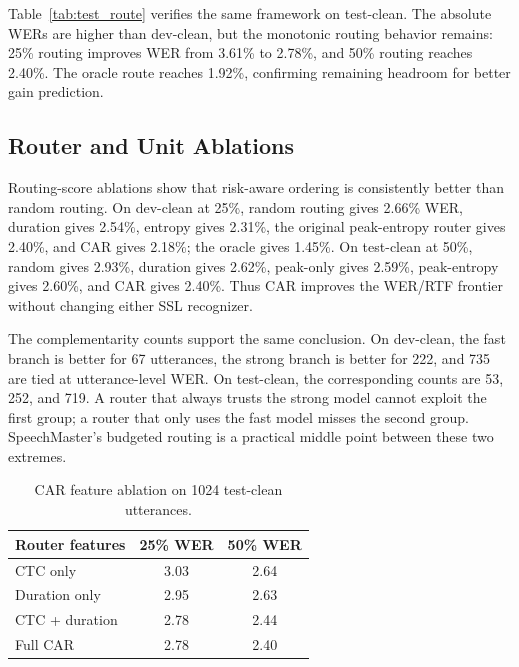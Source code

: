 \documentclass{article}
\begin{document}
Table~\ref{tab:test_route} verifies the same framework on test-clean. The
absolute WERs are higher than dev-clean, but the monotonic routing behavior
remains: 25\% routing improves WER from 3.61\% to 2.78\%, and 50\% routing
reaches 2.40\%. The oracle route reaches 1.92\%, confirming remaining headroom
for better gain prediction.

\begin{table}[t]
\centering
\caption{SpeechMaster-CAR routing on 1024 LibriSpeech test-clean utterances.}
\label{tab:test_route}
\small
{}
\end{table}

\subsection{Router and Unit Ablations}

Routing-score ablations show that risk-aware ordering is consistently better
than random routing. On dev-clean at 25\%, random routing gives 2.66\% WER,
duration gives 2.54\%, entropy gives 2.31\%, the original peak-entropy router
gives 2.40\%, and CAR gives 2.18\%; the oracle gives 1.45\%. On test-clean at
50\%, random gives 2.93\%, duration gives 2.62\%, peak-only gives 2.59\%,
peak-entropy gives 2.60\%, and CAR gives 2.40\%. Thus CAR improves the
WER/RTF frontier without changing either SSL recognizer.

The complementarity counts support the same conclusion. On dev-clean, the fast
branch is better for 67 utterances, the strong branch is better for 222, and
735 are tied at utterance-level WER. On test-clean, the corresponding counts are
53, 252, and 719. A router that always trusts the strong model cannot exploit
the first group; a router that only uses the fast model misses the second group.
SpeechMaster's budgeted routing is a practical middle point between these two
extremes.

\begin{table}[t]
\centering
\caption{CAR feature ablation on 1024 test-clean utterances.}
\label{tab:car_ablation}
\small
\begin{tabular}{lcc}
\toprule
Router features & 25\% WER & 50\% WER\\
\midrule
CTC only & 3.03 & 2.64\\
Duration only & 2.95 & 2.63\\
CTC + duration & 2.78 & 2.44\\
Full CAR & 2.78 & 2.40\\
\bottomrule
\end{tabular}
\end{table}
\end{document}
